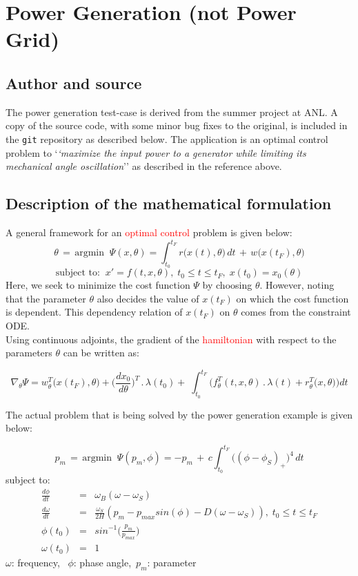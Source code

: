 \section{Power Generation (not Power Grid)}
\subsection{Author and source}
The power generation test-case is derived from the summer project \cite{Rao_2013} at ANL. A copy of the source code, with some minor bug fixes to the original, is included in the \texttt{git} repository as described below. The application is an optimal control problem to `\textit{`maximize the input power to a generator while limiting its mechanical angle oscillation}'' as described in the reference above.
\subsection{Description of the mathematical formulation}\label{power_cont_adj_math}
A general framework for an \textcolor{red}{optimal control} \cite{Sandu_2012} problem is given below:
\[ \theta \,=\, \text{argmin} \;\; \Psi(x, \theta) = \int_{t_0}^{t_F} r\big(x(t), \theta\big)\, dt \,+\, w\big(x(t_F), \theta\big)\]
\[ \text{subject to:} \;\; x' = f(t, x, \theta), \; t_0 \leq t \leq t_F, \; x(t_0) = x_0(\theta) \]
Here, we seek to minimize the cost function $\Psi$ by choosing $\theta$. However, noting that the parameter $\theta$ also decides the value of $x(t_F)$ on which the cost function is dependent. This dependency relation of $x(t_F)$ on $\theta$ comes from the constraint ODE.\\

\noindent Using continuous adjoints, the gradient of the \textcolor{red}{hamiltonian} with respect to the parameters $\theta$ can be written as:

\[\nabla_{\theta} \Psi = w_{\theta}^T\big(x(t_F), \theta\big) + \bigg(\frac{d x_0}{d \theta}\bigg)^T \,.\, \lambda(t_0) +\;\int_{t_0}^{t_F} \bigg(f_{\theta}^T(t, x, \theta) \,.\, \lambda(t) + r_{\theta}^T\big(x,\theta\big)\bigg) dt\]

\noindent The actual problem that is being solved by the power generation example is given below:

\[ p_m \,=\, \text{argmin} \;\; \Psi( p_m, \phi) = - p_m \,+\, c \int_{t_0}^{t_F} \big((\phi - \phi_S)_{+}\big)^4 \, dt\]
subject to: 
\begin{eqnarray*}
\frac{d\phi}{dt} &=& \omega_B (\omega - \omega_S)\\
\frac{d\omega}{dt} &=& \frac{\omega_S}{2H} (p_m - p_{max} sin(\phi) - D(\omega - \omega_S)),\; t_0 \leq t \leq t_F \\
\phi(t_0) &=& sin^{-1}\bigg(\frac{p_m}{p_{max}}\bigg) \\
\omega(t_0) &=& 1 
\end{eqnarray*}
$\omega$: frequency, \, $\phi$: phase angle,\, $p_m$: parameter\\

